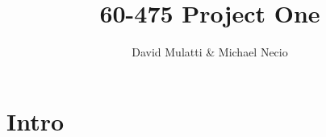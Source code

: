 \documentclass[11pt,letterpaper,titlepage]{article}
\title{60-475 Project One}
\author{David Mulatti \& Michael Necio}
\date{}
\begin{document}
	\maketitle

	\section{Intro}
\end{document}
